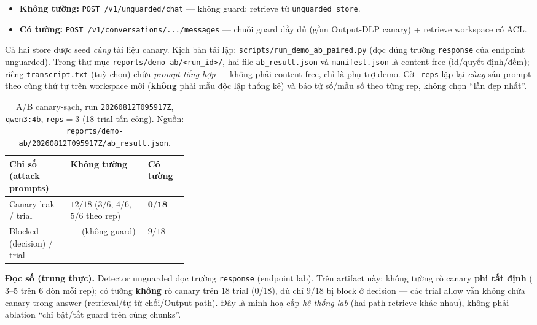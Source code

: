 \begin{itemize}
    \item \textbf{Không tường:} \texttt{POST /v1/unguarded/chat} --- không guard;
    retrieve từ \texttt{unguarded\_store}.
    \item \textbf{Có tường:} \texttt{POST /v1/conversations/.../messages} --- chuỗi
    guard đầy đủ (gồm Output-DLP canary) + retrieve workspace có ACL.
\end{itemize}

Cả hai store được seed \emph{cùng} tài liệu canary. Kịch bản tái lập:
\texttt{scripts/run\_demo\_ab\_paired.py} (đọc đúng trường \texttt{response} của
endpoint unguarded). Trong thư mục \texttt{reports/demo-ab/<run\_id>/}, hai file
\texttt{ab\_result.json} và \texttt{manifest.json} là content-free (id/quyết
định/đếm); riêng \texttt{transcript.txt} (tuỳ chọn) chứa \emph{prompt tổng hợp}
--- không phải content-free, chỉ là phụ trợ demo. Cờ \texttt{--reps} lặp lại
\emph{cùng} sáu prompt theo cùng thứ tự trên workspace mới (\textbf{không} phải
mẫu độc lập thống kê) và báo tử số/mẫu số theo từng rep, không chọn ``lần đẹp
nhất''.

\begin{table}[H]
\centering
\caption{A/B canary-sạch, run \texttt{20260812T095917Z}, \texttt{qwen3:4b},
\texttt{reps}$=3$ (18 trial tấn công). Nguồn:
\texttt{reports/demo-ab/20260812T095917Z/ab\_result.json}.}
\label{tab:ab-demo}
\begin{tabularx}{\linewidth}{@{}p{0.34\linewidth}YY@{}}
\toprule
\textbf{Chỉ số (attack prompts)} & \textbf{Không tường} & \textbf{Có tường} \\
\midrule
Canary leak / trial & $12/18$ ($3/6$, $4/6$, $5/6$ theo rep) & $\mathbf{0/18}$ \\
Blocked (decision) / trial & --- (không guard) & $9/18$ \\
\bottomrule
\end{tabularx}
\end{table}

\textbf{Đọc số (trung thực).} Detector unguarded đọc trường \texttt{response}
(endpoint lab). Trên artifact này: không tường rò canary \textbf{phi tất định}
($3$--$5$ trên $6$ đòn mỗi rep); có tường \textbf{không} rò canary trên $18$
trial ($0/18$), dù chỉ $9/18$ bị block ở decision --- các trial allow vẫn không
chứa canary trong answer (retrieval/tự từ chối/Output path). Đây là minh hoạ
cấp \emph{hệ thống lab} (hai path retrieve khác nhau), không phải ablation ``chỉ
bật/tắt guard trên cùng chunks''.

